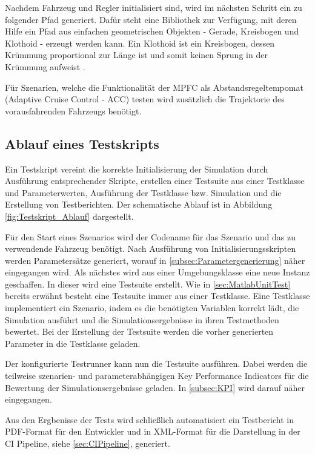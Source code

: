 Nachdem Fahrzeug und Regler initialisiert sind, wird im nächsten Schritt ein zu folgender Pfad generiert. Dafür steht eine Bibliothek zur Verfügung, mit deren Hilfe ein Pfad aus einfachen geometrischen Objekten - Gerade, Kreisbogen und Klothoid - erzeugt werden kann. Ein Klothoid ist ein Kreisbogen, dessen Krümmung proportional zur Länge ist und somit keinen Sprung in der Krümmung aufweist \cite{klothoidWiki}.

Für Szenarien, welche die Funktionalität der MPFC als Abstandsregeltempomat (Adaptive Cruise Control - ACC) testen wird zusätzlich die Trajektorie des vorausfahrenden Fahrzeugs benötigt.

\subsection{Ablauf eines Testskripts} \label{subsec:Testskript}
Ein Testskript vereint die korrekte Initialisierung der Simulation durch Ausführung entsprechender Skripte, erstellen einer Testsuite aus einer Testklasse und Parameterwerten, Ausführung der Testklasse bzw. Simulation und die Erstellung von Testberichten. Der schematische Ablauf ist in Abbildung \ref{fig:Testskript_Ablauf} dargestellt.\medskip

\noindent Für den Start eines Szenarios wird der Codename für das Szenario und das zu verwendende Fahrzeug benötigt. Nach Ausführung von Initialisierungsskripten werden Parametersätze generiert, worauf in \ref{subsec:Parametergenerierung} näher eingegangen wird. Als nächstes wird aus einer Umgebungsklasse eine neue Instanz geschaffen. In dieser wird eine Testsuite erstellt. Wie in \ref{sec:MatlabUnitTest} bereits erwähnt besteht eine Testsuite immer aus einer Testklasse. Eine Testklasse implementiert ein Szenario, indem es die benötigten Variablen korrekt lädt, die Simulation ausführt und die Simulationsergebnisse in ihren Testmethoden bewertet. Bei der Erstellung der Testsuite werden die vorher generierten Parameter in die Testklasse geladen.\medskip

\noindent Der konfigurierte Testrunner kann nun die Testsuite ausführen. Dabei werden die teilweise szenarien- und parameterabhängigen Key Performance Indicators für die Bewertung der Simulationsergebnisse geladen. In \ref{subsec:KPI} wird darauf näher eingegangen.\medskip

\noindent Aus den Ergbenisse der Tests wird schließlich automatisiert ein Testbericht in PDF-Format für den Entwickler und in XML-Format für die Darstellung in der CI Pipeline, siehe \ref{sec:CIPipeline}, generiert.

